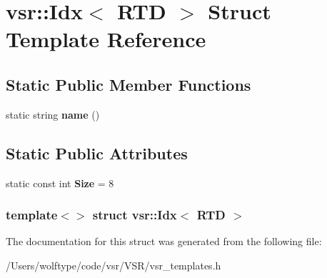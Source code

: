 \hypertarget{structvsr_1_1_idx_3_01_r_t_d_01_4}{\section{vsr\-:\-:Idx$<$ R\-T\-D $>$ Struct Template Reference}
\label{structvsr_1_1_idx_3_01_r_t_d_01_4}
}
\subsection*{Static Public Member Functions}
\begin{DoxyCompactItemize}
\item 
\hypertarget{structvsr_1_1_idx_3_01_r_t_d_01_4_aaf9d199c03ace684237a109c92262233}{static string {\bfseries name} ()}\label{structvsr_1_1_idx_3_01_r_t_d_01_4_aaf9d199c03ace684237a109c92262233}

\end{DoxyCompactItemize}
\subsection*{Static Public Attributes}
\begin{DoxyCompactItemize}
\item 
\hypertarget{structvsr_1_1_idx_3_01_r_t_d_01_4_a88ea3b153ac82a54523ce662a0f33ee4}{static const int {\bfseries Size} = 8}\label{structvsr_1_1_idx_3_01_r_t_d_01_4_a88ea3b153ac82a54523ce662a0f33ee4}

\end{DoxyCompactItemize}
\subsubsection*{template$<$$>$ struct vsr\-::\-Idx$<$ R\-T\-D $>$}



The documentation for this struct was generated from the following file\-:\begin{DoxyCompactItemize}
\item 
/\-Users/wolftype/code/vsr/\-V\-S\-R/vsr\-\_\-templates.\-h\end{DoxyCompactItemize}
